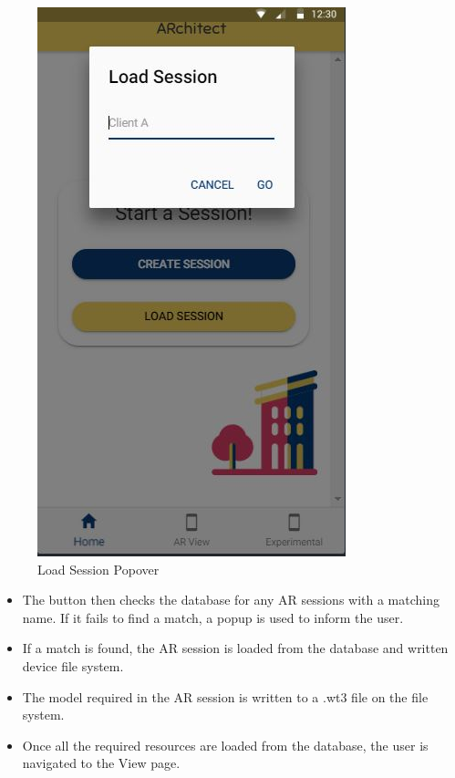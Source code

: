 \begin{figure}[ht!]
\caption{Load Session Popover}
\centering
\includegraphics[scale=0.55]{images/load_session_popover.JPG}
\end{figure}

\begin{itemize}
    \item The  button then checks the database for any AR sessions with a matching name. If it fails to find a match, a popup is used to inform the user.
    
    \item If a match is found, the AR session is loaded from the database and written device file system. 
    
    \item
    The model required in the AR session is written to a .wt3 file on the file system.

    \item
    Once all the required resources are loaded from the database, the user is navigated to the  View page. \\ \\
    
    
\end{itemize}



